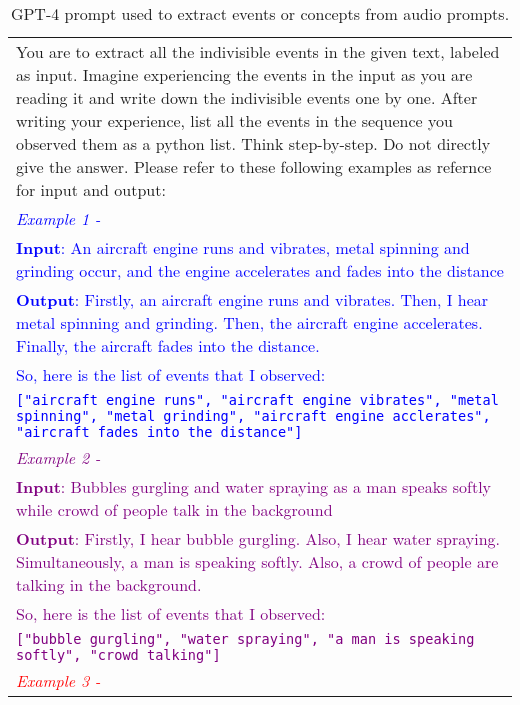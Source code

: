 \begin{table*}[ht!]
    \centering
    \caption{GPT-4 prompt used to extract events or concepts from audio prompts.}
    \begin{tabular}{|p{15cm}|} %
        \hline
        You are to extract all the indivisible events in the given text, labeled as input. Imagine experiencing the events in the input as you are reading it and write down the indivisible events one by one. After writing your experience, list all the events in the sequence you observed them as a python list. Think step-by-step. Do not directly give the answer. Please refer to these following examples as refernce for input and output:\\
    \textcolor{blue}{\textit{Example 1 -}}\\
    \textcolor{blue}{\textbf{Input}: An aircraft engine runs and vibrates, metal spinning and grinding occur, and the engine accelerates and fades into the distance}\\
    \textcolor{blue}{\textbf{Output}: Firstly, an aircraft engine runs and vibrates. Then, I hear metal spinning and grinding. Then, the aircraft engine accelerates. Finally, the aircraft fades into the distance.}\\
    \textcolor{blue}{So, here is the list of events that I observed:}\\
    \textcolor{blue}{\texttt{["aircraft engine runs", "aircraft engine vibrates", "metal spinning", "metal grinding", "aircraft engine acclerates", "aircraft fades into the distance"]}}\\
    \textcolor{purple}{\textit{Example 2 -}}\\
    \textcolor{purple}{\textbf{Input}: Bubbles gurgling and water spraying as a man speaks softly while crowd of people talk in the background}\\
    \textcolor{purple}{\textbf{Output}: Firstly, I hear bubble gurgling. Also, I hear water spraying. Simultaneously, a man is speaking softly. Also, a crowd of people are talking in the background. }\\
    \textcolor{purple}{So, here is the list of events that I observed:}\\
    \textcolor{purple}{\texttt{["bubble gurgling", "water spraying", "a man is speaking softly", "crowd talking"]}}\\
   \textcolor{red}{\textit{Example 3 -}}\\

\end{tabular}
\end{table*}
